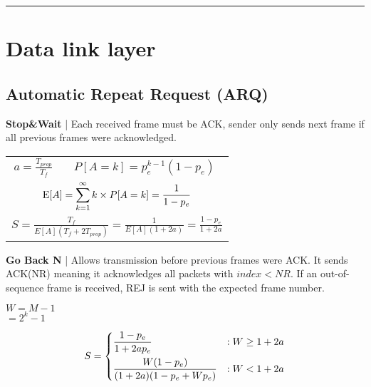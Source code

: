 \documentclass{form}
\begin{document}
\vspace{-0em}\noindent\rule{\textwidth}{1.0pt}\vspace{0.5em}

\noindent%
\begin{minipage}[c]{0.495\textwidth}
    \section*{Data link layer}
    \subsection*{Automatic Repeat Request (ARQ)}
    \textbf{Stop\&Wait} |
    Each received frame must be ACK, sender only sends next frame if all previous frames were acknowledged.
    \begin{center}
        \begin{tabular}{c c}
            $\displaystyle a = \frac{T_{prop}}{T_f}$ & $\displaystyle P[A=k] = p_e^{k-1} (1-p_e)$ \\
            \multicolumn{2}{c}{$\displaystyle \operatorname{E}[A] = \sum_{k=1}^{\infty}{k \times P[A=k]} = \frac{1}{1-p_e}$} \\
            \multicolumn{2}{c}{$\displaystyle S            = \frac{T_f}{E[A](T_f+2T_{prop})} = \frac{1}{E[A](1+2a)} = \frac{1-p_e}{1+2a}$}
        \end{tabular}
    \end{center}
    \textbf{Go Back N} |
    Allows transmission before previous frames were ACK. It sends ACK(NR) meaning it acknowledges all packets with $index < NR$.
    If an out-of-sequence frame is received, REJ is sent with the expected frame number.

    \noindent
    \begin{minipage}[c]{28mm}
        $W = M-1$ \\ $= 2^k-1$
    \end{minipage}%
    \begin{minipage}[c]{71mm}
        \begin{equation*}
            S = \begin{dcases}
                \frac{1-p_e}{1+2ap_e}               & : W \geq 1+2a \\
                \frac{W(1-p_e)}{(1+2a)(1-p_e+Wp_e)} & : W < 1+2a
            \end{dcases}
        \end{equation*}
    \end{minipage}
\end{minipage}
\end{document}
